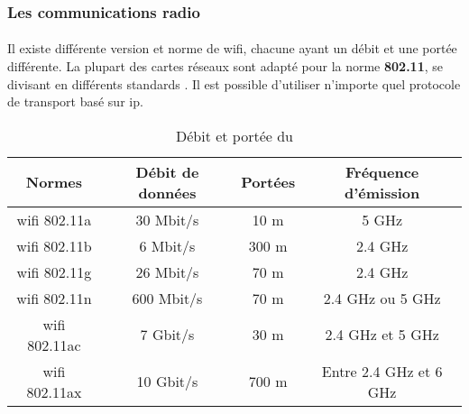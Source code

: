 \subsubsection{Les communications radio}
\label{sec:communicationRadio}

\paragraph{}
\label{sec:wifi}

Il existe différente version et norme de \gls{wifi}, chacune ayant un débit et une portée différente.
La plupart des cartes réseaux sont adapté pour la norme \textbf{802.11}, se divisant en différents standards
\cite{wifi}. Il est possible d’utiliser n’importe quel protocole de transport basé sur \gls{ip}.\newline

\begin{table}[ht!]
    \centering
    \begin{tabular}{|c|c|c|c|}
        \hline
        \rowcolor{tableColorDark} Normes & Débit de données & Portées & Fréquence d'émission   \\
        \hline

        \gls{wifi} 802.11a               & 30 Mbit/s        & 10 m    & 5 GHz                  \\\hline
        \gls{wifi} 802.11b               & 6 Mbit/s         & 300 m   & 2.4 GHz                \\\hline
        \gls{wifi} 802.11g               & 26 Mbit/s        & 70 m    & 2.4 GHz                \\\hline
        \gls{wifi} 802.11n               & 600 Mbit/s       & 70 m    & 2.4 GHz ou 5 GHz       \\\hline
        \gls{wifi} 802.11ac              & 7 Gbit/s         & 30 m    & 2.4 GHz et 5 GHz       \\\hline
        \gls{wifi} 802.11ax              & 10 Gbit/s        & 700 m   & Entre 2.4 GHz et 6 GHz \\\hline
    \end{tabular}
    \label{tab:debitPorteeWifi}
    \caption{Débit et portée du }
    \nocite{debitPortee}
\end{table}

\paragraph{}
\label{sec:wimax}

